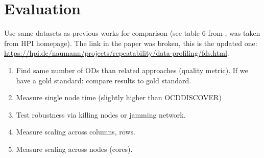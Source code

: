 
\section{Evaluation}\label{sec:evaluation}


  Use same datasets as previous works for comparison (see table 6 from \citep{consonni}, was taken from HPI homepage).
  The link in the paper was broken, this is the updated one: \url{https://hpi.de/naumann/projects/repeatability/data-profiling/fds.html}.

  \begin{enumerate}
    \item Find same number of ODs than related approaches (quality metric). If we have a gold standard: compare results to gold standard.
    \item Measure single node time (slightly higher than OCDDISCOVER)
    \item Test robustness via killing nodes or jamming network.
    \item Measure scaling across columns, rows.
    \item Measure scaling across nodes (cores).
  \end{enumerate}
